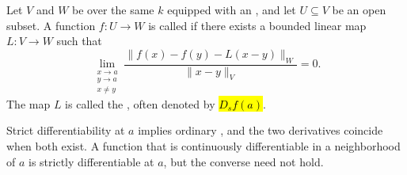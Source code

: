 \begin{definition} \label{definition:strictly_differentiable_function_between_normed_vector_spaces}
    Let $V$ and $W$ be  over the same  $k$ equipped with an , and let $U \subseteq V$ be an open subset. A function $f : U \to W$ is called  if there exists a bounded linear map $L : V \to W$ such that
    $$\lim_{\substack{x \to a \\ y \to a \\ x \neq y}} \frac{\|f(x) - f(y) - L(x - y)\|_W}{\|x - y\|_V} = 0.$$
    The map $L$ is called the , often denoted by \hl{$D_s f(a)$}.

    Strict differentiability at $a$ implies ordinary , and the two derivatives coincide when both exist. A function that is continuously differentiable in a neighborhood of $a$ is strictly differentiable at $a$, but the converse need not hold.
\end{definition}